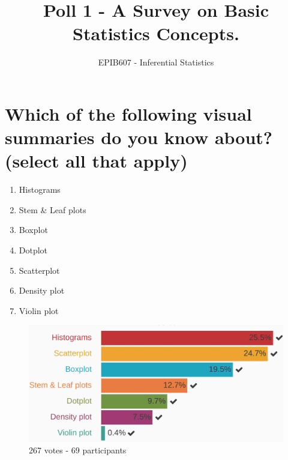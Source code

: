 \documentclass[letterpaper,10pt,twoside,printwatermark=false]{pinp}
\title{Poll 1 - A Survey on Basic Statistics Concepts.}
\author[a]{EPIB607 - Inferential Statistics}
\affil[a]{Fall 2018, McGill University}
\providecommand{\tightlist}{%
  \setlength{\itemsep}{0pt}\setlength{\parskip}{0pt}}
\begin{document}
\verticaladjustment{-2pt}

\maketitle
\thispagestyle{firststyle}



\section{Which of the following visual summaries do you know about?
(select all that
apply)}\label{which-of-the-following-visual-summaries-do-you-know-about-select-all-that-apply}

\begin{enumerate}
\def\labelenumi{\arabic{enumi}.}
\tightlist
\item
  Histograms
\item
  Stem \& Leaf plots
\item
  Boxplot
\item
  Dotplot
\item
  Scatterplot
\item
  Density plot
\item
  Violin plot
\end{enumerate}

\begin{figure}[H]
  \begin{center}
    \includegraphics[scale=0.15]{q1.jpg} 
  \end{center}
  \caption{267 votes - 69 participants}\label{fig}
\end{figure}
\end{document}
